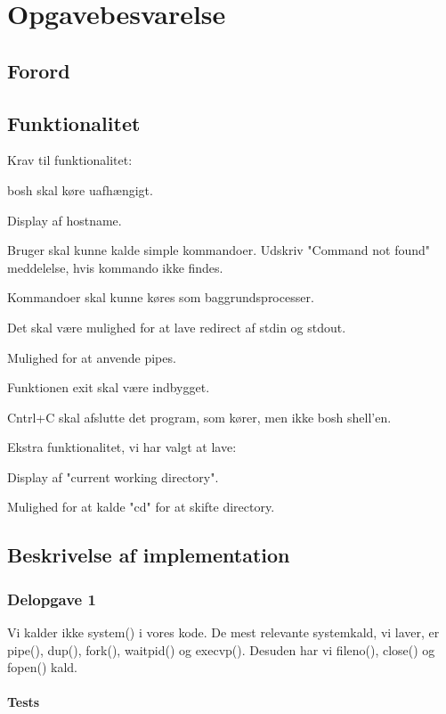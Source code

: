 \chapter{Opgavebesvarelse}
\section{Forord}

\section{Funktionalitet}
Krav til funktionalitet:
\begin{my_enumerate}
\item bosh skal køre uafhængigt.
\item Display af hostname.
\item Bruger skal kunne kalde simple kommandoer. Udskriv "Command not found" meddelelse, hvis kommando ikke findes.
\item Kommandoer skal kunne køres som baggrundsprocesser.
\item Det skal være mulighed for at lave redirect af stdin og stdout.
\item Mulighed for at anvende pipes.
\item Funktionen exit skal være indbygget.
\item Cntrl+C skal afslutte det program, som kører, men ikke bosh shell'en.
\end{my_enumerate}

Ekstra funktionalitet, vi har valgt at lave:
\begin{my_enumerate}
\item Display af "current working directory".
\item Mulighed for at kalde "cd" for at skifte directory.
\end{my_enumerate}

\section{Beskrivelse af implementation}
\subsection{Delopgave 1}
Vi kalder ikke system() i vores kode. De mest relevante systemkald, vi laver, er pipe(), dup(), fork(), waitpid() og execvp(). Desuden har vi fileno(), close() og fopen() kald.
\subsubsection{Tests}

